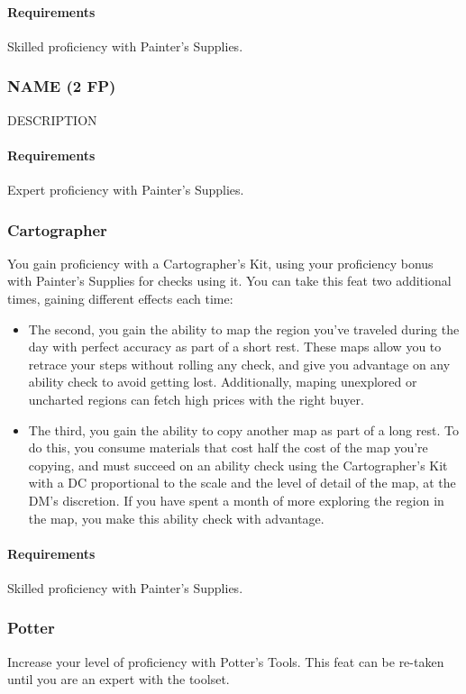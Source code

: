     \paragraph{Requirements} Skilled proficiency with Painter's Supplies.
\subsubsection{NAME (2 FP)} \label{feat::name}
    DESCRIPTION
    \paragraph{Requirements} Expert proficiency with Painter's Supplies.
\subsubsection{Cartographer} \label{feat::cartographer}
    You gain proficiency with a Cartographer's Kit, using your proficiency bonus with Painter's Supplies for checks using it.
    You can take this feat two additional times, gaining different effects each time:
    \begin{itemize}
        \item The second, you gain the ability to map the region you've traveled during the day with perfect accuracy as part of a short rest.
        These maps allow you to retrace your steps without rolling any check, and give you advantage on any ability check to avoid getting lost.
        Additionally, maping unexplored or uncharted regions can fetch high prices with the right buyer.
        \item The third, you gain the ability to copy another map as part of a long rest.
        To do this, you consume materials that cost half the cost of the map you're copying, and must succeed on an ability check using the Cartographer's Kit with a DC proportional to the scale and the level of detail of the map, at the DM's discretion.
        If you have spent a month of more exploring the region in the map, you make this ability check with advantage.
    \end{itemize}
    \paragraph{Requirements} Skilled proficiency with Painter's Supplies.
\subsubsection{Potter} \label{feat::potter}
    Increase your level of proficiency with Potter's Tools.
    This feat can be re-taken until you are an expert with the toolset.
